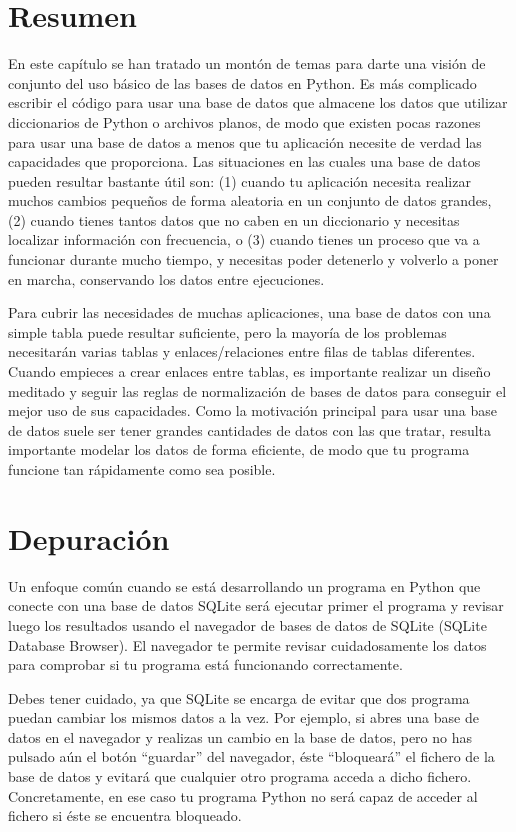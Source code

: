 \section{Resumen}

En este capítulo se han tratado un montón de temas para darte una visión de conjunto del uso básico
de las bases de datos en Python. Es más complicado escribir el código para usar una base
de datos que almacene los datos que utilizar diccionarios de Python o archivos planos, de modo que
existen pocas razones para usar una base de datos a menos que tu aplicación necesite de verdad
las capacidades que proporciona. Las situaciones en las cuales una base de datos pueden resultar
bastante útil son:
(1) cuando tu aplicación necesita realizar muchos cambios pequeños de forma aleatoria en un conjunto
de datos grandes,
(2) cuando tienes tantos datos que no caben en un diccionario y necesitas localizar
información con frecuencia, o
(3) cuando tienes un proceso que va a funcionar durante mucho tiempo, y necesitas poder
detenerlo y volverlo a poner en marcha, conservando los datos entre ejecuciones.

Para cubrir las necesidades de muchas aplicaciones, una base de datos con una simple tabla puede
resultar suficiente, pero la mayoría de los problemas necesitarán varias tablas y enlaces/relaciones
entre filas de tablas diferentes. Cuando empieces a crear enlaces entre tablas,
es importante realizar un diseño meditado y seguir las
reglas de normalización de bases de datos para conseguir el mejor uso de sus capacidades.
Como la motivación principal para usar una base de datos
suele ser tener grandes cantidades de datos con las que tratar, resulta importante
modelar los datos de forma eficiente, de modo que tu programa funcione tan rápidamente como sea
posible. 

\section{Depuración}

Un enfoque común cuando se está desarrollando un programa en Python que conecte con
una base de datos SQLite será ejecutar primer el programa y revisar luego los
resultados usando el navegador de bases de datos de SQLite (SQLite Database Browser). El navegador
te permite revisar cuidadosamente los datos para comprobar si tu programa está funcionando
correctamente.

Debes tener cuidado, ya que SQLite se encarga de evitar que dos programa puedan
cambiar los mismos datos a la vez. Por ejemplo, si abres
una base de datos en el navegador y realizas un cambio en la base de datos,
pero no has pulsado aún el botón ``guardar'' del navegador, éste
``bloqueará'' el fichero de la base de datos y evitará que cualquier otro programa
acceda a dicho fichero. Concretamente, en ese caso tu programa Python
no será capaz de acceder al fichero si éste se encuentra bloqueado.

